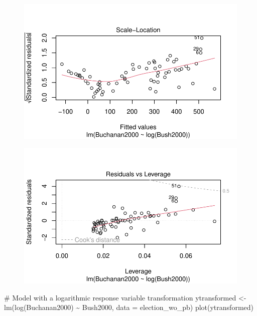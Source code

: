 \documentclass[
  letterpaper,
  DIV=11,
  numbers=noendperiod]{scrartcl}
\newenvironment{Shaded}{\begin{snugshade}}{\end{snugshade}}
\newcommand{\AttributeTok}[1]{\textcolor[rgb]{0.40,0.45,0.13}{#1}}
\newcommand{\CommentTok}[1]{\textcolor[rgb]{0.37,0.37,0.37}{#1}}
\newcommand{\FunctionTok}[1]{\textcolor[rgb]{0.28,0.35,0.67}{#1}}
\newcommand{\NormalTok}[1]{\textcolor[rgb]{0.00,0.23,0.31}{#1}}
\newcommand{\OtherTok}[1]{\textcolor[rgb]{0.00,0.23,0.31}{#1}}
\newcommand{\SpecialCharTok}[1]{\textcolor[rgb]{0.37,0.37,0.37}{#1}}
\begin{document}
\begin{figure}[H]

{\centering \includegraphics{case_study_1_files/figure-pdf/unnamed-chunk-6-8.pdf}

}

\end{figure}

\begin{figure}[H]

{\centering \includegraphics{case_study_1_files/figure-pdf/unnamed-chunk-6-9.pdf}

}

\end{figure}

\begin{Shaded}
\begin{Highlighting}[]
\CommentTok{\# Model with a logarithmic response variable transformation}
\NormalTok{ytransformed }\OtherTok{\textless{}{-}} \FunctionTok{lm}\NormalTok{(}\FunctionTok{log}\NormalTok{(Buchanan2000) }\SpecialCharTok{\textasciitilde{}}\NormalTok{ Bush2000, }\AttributeTok{data =}\NormalTok{ election\_wo\_pb)}
\FunctionTok{plot}\NormalTok{(ytransformed)}
\end{Highlighting}
\end{Shaded}
\end{document}
